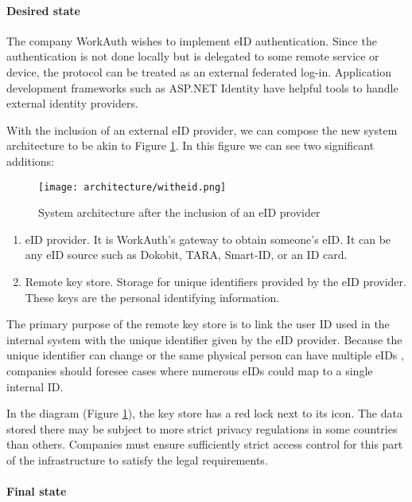 \paragraph{Desired state}

The company WorkAuth wishes to implement eID authentication. Since the authentication is not done locally but is delegated to some remote service or device, the protocol can be treated as an external federated log-in. Application development frameworks such as ASP.NET Identity have helpful tools to handle external identity providers.

With the inclusion of an external eID provider, we can compose the new system architecture to be akin to Figure \ref{fig:sys-highlevel-witheid}. In this figure we can see two significant additions:

\begin{figure}
  \centering
  \texttt{[image: architecture/witheid.png]}
  \caption{System architecture after the inclusion of an eID provider}
  \label{fig:sys-highlevel-witheid}
\end{figure}

\begin{enumerate}
  \item {eID provider}. It is WorkAuth's gateway to obtain someone's eID. It can be any eID source such as Dokobit, TARA, Smart-ID, or an ID card.
  \item {Remote key store}. Storage for unique identifiers provided by the eID provider. These keys are the personal identifying information.
\end{enumerate}

The primary purpose of the remote key store is to link the user ID used in the internal system with the unique identifier given by the eID provider. Because the unique identifier can change or the same physical person can have multiple eIDs \cite{eidas-saml}, companies should foresee cases where numerous eIDs could map to a single internal ID.

In the diagram (Figure \ref{fig:sys-highlevel-witheid}), the key store has a red lock next to its icon. The data stored there may be subject to more strict privacy regulations in some countries than others. Companies must ensure sufficiently strict access control for this part of the infrastructure to satisfy the legal requirements.

\paragraph{Final state}

